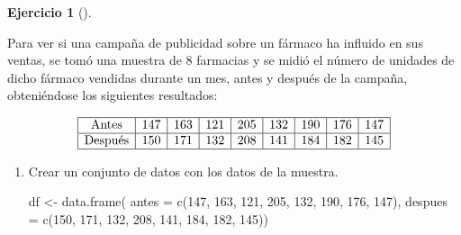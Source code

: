 \documentclass[
  a4paper,
]{scrreport}
\newenvironment{Shaded}{\begin{snugshade}}{\end{snugshade}}
\newcommand{\AttributeTok}[1]{\textcolor[rgb]{0.40,0.45,0.13}{#1}}
\newcommand{\DecValTok}[1]{\textcolor[rgb]{0.68,0.00,0.00}{#1}}
\newcommand{\FunctionTok}[1]{\textcolor[rgb]{0.28,0.35,0.67}{#1}}
\newcommand{\NormalTok}[1]{\textcolor[rgb]{0.00,0.23,0.31}{#1}}
\newcommand{\OtherTok}[1]{\textcolor[rgb]{0.00,0.23,0.31}{#1}}
\theoremstyle{definition}
\newtheorem{exercise}{Ejercicio}[chapter]
\theoremstyle{remark}
\begin{document}
\begin{exercise}[]\protect\hypertarget{exr-intervalo-diferencia-medias-datos-pareados-campaña-publicidad}{}\label{exr-intervalo-diferencia-medias-datos-pareados-campaña-publicidad}

Para ver si una campaña de publicidad sobre un fármaco ha influido en
sus ventas, se tomó una muestra de 8 farmacias y se midió el número de
unidades de dicho fármaco vendidas durante un mes, antes y después de la
campaña, obteniéndose los siguientes resultados:

\[
\begin{array}{|c|c|c|c|c|c|c|c|c|}
\hline 
\mbox{Antes} & 147 & 163 & 121 & 205 & 132 & 190 & 176 & 147 \\
\hline 
\mbox{Después} & 150 & 171 & 132 & 208 & 141 & 184 & 182 & 145\\ 
\hline
\end{array}
\]

\begin{enumerate}
\def\labelenumi{\alph{enumi}.}
\item
  Crear un conjunto de datos con los datos de la muestra.

  \begin{tcolorbox}[enhanced jigsaw, coltitle=black, left=2mm, colback=white, leftrule=.75mm, toptitle=1mm, breakable, bottomrule=.15mm, titlerule=0mm, bottomtitle=1mm, title=\textcolor{quarto-callout-tip-color}{\faLightbulb}\hspace{0.5em}{Solución}, arc=.35mm, toprule=.15mm, rightrule=.15mm, colframe=quarto-callout-tip-color-frame, opacityback=0, colbacktitle=quarto-callout-tip-color!10!white, opacitybacktitle=0.6]

\begin{Shaded}
\begin{Highlighting}[]
\NormalTok{df }\OtherTok{\textless{}{-}} \FunctionTok{data.frame}\NormalTok{(}
    \AttributeTok{antes =} \FunctionTok{c}\NormalTok{(}\DecValTok{147}\NormalTok{, }\DecValTok{163}\NormalTok{, }\DecValTok{121}\NormalTok{, }\DecValTok{205}\NormalTok{, }\DecValTok{132}\NormalTok{, }\DecValTok{190}\NormalTok{, }\DecValTok{176}\NormalTok{, }\DecValTok{147}\NormalTok{),}
    \AttributeTok{despues =} \FunctionTok{c}\NormalTok{(}\DecValTok{150}\NormalTok{, }\DecValTok{171}\NormalTok{, }\DecValTok{132}\NormalTok{, }\DecValTok{208}\NormalTok{, }\DecValTok{141}\NormalTok{, }\DecValTok{184}\NormalTok{, }\DecValTok{182}\NormalTok{, }\DecValTok{145}\NormalTok{))}
\end{Highlighting}
\end{Shaded}


\end{tcolorbox}
\end{enumerate}
\end{exercise}
\end{document}
